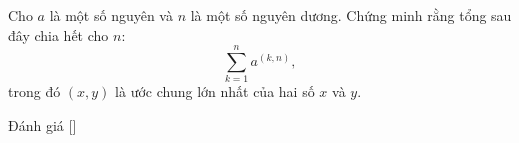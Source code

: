 \ifshowproblem
\begin{problem}\label{problem:ROU-2015-TST-D2-P1}
\end{problem}
    Cho \( a \) là một số nguyên và \( n \) là một số nguyên dương.  
    Chứng minh rằng tổng sau đây chia hết cho \( n \):
    \[
        \sum_{k=1}^{n} a^{(k,n)},
    \]
    trong đó \( (x, y) \) là ước chung lớn nhất của hai số \( x \) và \( y \).
\fi

\ifshowinfo
Đánh giá [\textbf{}]\footnotemark
{}
\fi